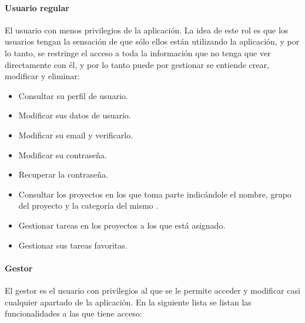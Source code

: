 \paragraph{Usuario regular}
El usuario con menos privilegios de la aplicación. La idea de este rol es que
los usuarios tengan la sensación de que sólo ellos están utilizando la
aplicación, y por lo tanto, se restringe el acceso a toda la información que no
tenga que ver directamente con él, y por lo tanto puede \textemdash por
gestionar se entiende crear, modificar y eliminar\textemdash:

\begin{itemize}
    \item Consultar su perfil de usuario.
    \item Modificar sus datos de usuario.
    \item Modificar su email y verificarlo.
    \item Modificar su contraseña.
    \item Recuperar la contraseña.
    \item Consultar los proyectos en los que toma parte \textemdash indicándole
        el nombre, grupo del proyecto y la categoría del mismo \textemdash.
    \item Gestionar tareas en los proyectos a los que está asignado.
    \item Gestionar sus tareas favoritas.
\end{itemize}

\paragraph{Gestor}
El gestor es el usuario con privilegios al que se le permite acceder y
modificar casi cualquier apartado de la aplicación. En la siguiente lista
se listan las funcionalidades a las que tiene acceso:

